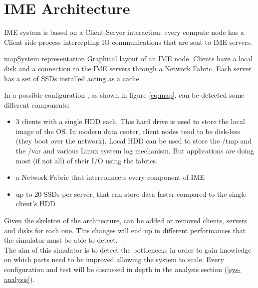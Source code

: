 
\chapter{IME Architecture}
IME system is based on a Client-Server interaction: every compute node has a
Client side process intercepting IO communications that are sent to IME servers.
\begin{myimage}{map}{System representation}
    Graphical layout of an IME node. Clients have a local disk and a connection
    to the IME servers through a Network Fabric. Each server has a set of SSDs
    installed acting as a cache
\end{myimage}
\newpage
In a possible configuration , as shown in figure \ref{eq:map}, can be detected
some different components:
\begin{itemize}
    \item 3 clients with a single HDD each. This hard drive is used to store
        the local image of the OS. In modern data center, client nodes tend
        to be disk-less (they boot over the network). Local HDD can be used
        to store the /tmp and the /var and various Linux system log
        mechanism. But applications are doing most (if not all) of their I/O
        using the fabrics.
    \item a Network Fabric that interconnects every component of IME
    \item up to 20 SSDs per server, that can store data faster compared to the single
        client's HDD
\end{itemize}

Given the skeleton of the architecture, can be added or removed clients,
servers and disks for each one. This changes will end up in different performances
that the simulator must be able to detect. \\
The aim of this simulator is to detect the bottlenecks in order to gain knowledge
on which parts need to be improved allowing the system to scale.
Every configuration and test will be discussed in depth in the analysis section
(\ref{sys-analysis}).

